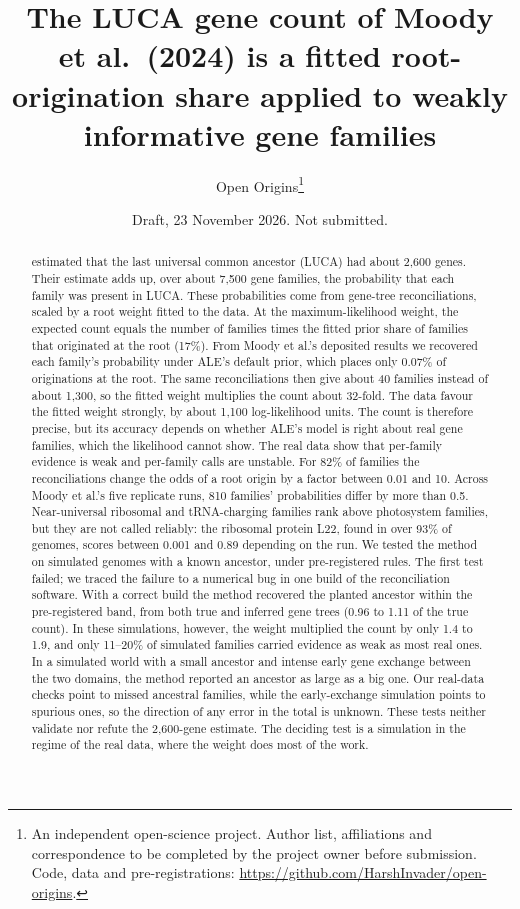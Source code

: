 \documentclass[11pt]{article}
\title{The LUCA gene count of Moody et al.\ (2024) is a fitted root-origination share applied to weakly informative gene families}
\author{Open Origins\thanks{An independent open-science project. Author list, affiliations and correspondence to be completed by the project owner before submission. Code, data and pre-registrations: \url{https://github.com/HarshInvader/open-origins}.}}
\date{Draft, 23 November 2026. Not submitted.}
\begin{document}
\maketitle

\begin{abstract}
\noindent
\citet{moody2024} estimated that the last universal common ancestor (LUCA) had about 2,600 genes. Their estimate adds up, over about 7,500 gene families, the probability that each family was present in LUCA. These probabilities come from gene-tree reconciliations, scaled by a root weight fitted to the data. At the maximum-likelihood weight, the expected count equals the number of families times the fitted prior share of families that originated at the root (17\%). From Moody et al.'s deposited results we recovered each family's probability under ALE's default prior, which places only 0.07\% of originations at the root. The same reconciliations then give about 40 families instead of about 1,300, so the fitted weight multiplies the count about 32-fold. The data favour the fitted weight strongly, by about 1,100 log-likelihood units. The count is therefore precise, but its accuracy depends on whether ALE's model is right about real gene families, which the likelihood cannot show. The real data show that per-family evidence is weak and per-family calls are unstable. For 82\% of families the reconciliations change the odds of a root origin by a factor between 0.01 and 10. Across Moody et al.'s five replicate runs, 810 families' probabilities differ by more than 0.5. Near-universal ribosomal and tRNA-charging families rank above photosystem families, but they are not called reliably: the ribosomal protein L22, found in over 93\% of genomes, scores between 0.001 and 0.89 depending on the run. We tested the method on simulated genomes with a known ancestor, under pre-registered rules. The first test failed; we traced the failure to a numerical bug in one build of the reconciliation software. With a correct build the method recovered the planted ancestor within the pre-registered band, from both true and inferred gene trees (0.96 to 1.11 of the true count). In these simulations, however, the weight multiplied the count by only 1.4 to 1.9, and only 11--20\% of simulated families carried evidence as weak as most real ones. In a simulated world with a small ancestor and intense early gene exchange between the two domains, the method reported an ancestor as large as a big one. Our real-data checks point to missed ancestral families, while the early-exchange simulation points to spurious ones, so the direction of any error in the total is unknown. These tests neither validate nor refute the 2,600-gene estimate. The deciding test is a simulation in the regime of the real data, where the weight does most of the work.
\end{abstract}
\end{document}
